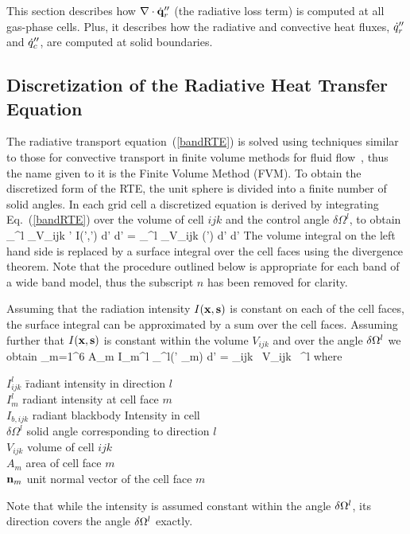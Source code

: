 \documentclass[11pt]{book}
\begin{document}
This section describes how $\nabla \cdot \dot{\bf q}_r''$ (the radiative loss term) is computed at all gas-phase cells. Plus, it describes how
the radiative and convective heat fluxes, $\dot{q}_r''$ and $\dot{q}_c''$, are computed at solid boundaries.

\subsection{Discretization of the Radiative Heat Transfer Equation}

The radiative transport equation~(\ref{bandRTE}) is solved using
techniques similar to those for convective transport in finite volume
methods for fluid flow~\cite{Raithby}, thus the name given to it is
the Finite Volume Method (FVM). To obtain the discretized form of the
RTE, the unit sphere is divided into a finite number of solid angles.
In each grid cell a discretized equation is derived by integrating
Eq.~(\ref{bandRTE}) over the volume of cell $ijk$ and the control
angle $\delta \Omega^l$, to obtain
\be
  \int_{\delta \Omega^l} \int_{V_{ijk}}
   \bs' \cdot \nabla I(\bx',\bs') d\bx' d\bs' =
   \int_{\delta \Omega^l} \int_{V_{ijk}} \kappa(\bx') \;
    \left[ I_{b}(\bx') - I(\bx',\bs') \right] d\bx' d\bs'
\ee
The volume integral on the left hand side is replaced by a surface
integral over the cell faces using the divergence theorem. Note that
the procedure outlined below is appropriate for each band of a wide
band model, thus the subscript $n$ has been removed for clarity.

Assuming that the radiation intensity $I({\bf x},{\bf s})$ is constant on each
of the cell faces, the surface integral can be approximated by a sum
over the cell faces.  Assuming further that $I({\bf x},{\bf s})$ is constant
within the volume $V_{ijk}$ and over the angle $\delta {\Omega}^l$ we
obtain
\be  \sum_{m=1}^6 A_m \; I_m^l \;
      \int_{\Omega^l}(\bs' \cdot \bn_m) d\bs'
   = \kappa_{ijk} \,
      \; V_{ijk} \,
     \delta \Omega^l   \label{RTEdiscrete2}
\ee
where
\begin{tabbing}
$I_{ijk}^l$ \hspace{1in}  \=  radiant intensity in direction $l$ \\
$I_m^l$                   \>  radiant intensity at cell face $m$ \\
$I_{b,ijk}$               \>  radiant blackbody Intensity in cell \\
$\delta \Omega^l$         \>  solid angle corresponding to direction $l$ \\
$V_{ijk}$                 \>  volume of cell $ijk$ \\
$A_m$                     \>  area of cell face $m$ \\
${\bf n}_m$                   \>  unit normal vector of the cell face $m$
\end{tabbing}
Note that while the intensity is assumed constant within
the angle $\delta {\Omega}^l$, its direction covers the angle $\delta {\Omega}^l$
exactly.
\end{document}
